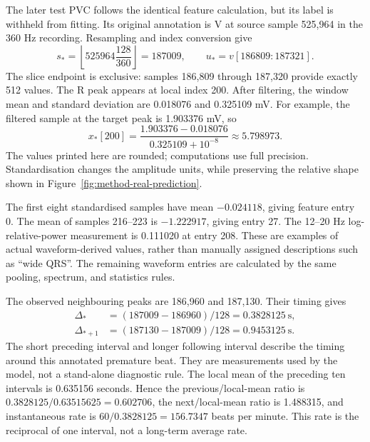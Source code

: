 The later test PVC follows the identical feature calculation, but its label
is withheld from fitting. Its original annotation is V at source sample
525,964 in the 360 Hz recording. Resampling and index conversion give
\begin{equation}
 s_* = \left\lfloor525964\frac{128}{360}\right\rfloor=187009,
 \qquad u_*=v[186809:187321].
 \label{eq:real-window-extraction}
\end{equation}
The slice endpoint is exclusive: samples 186,809 through 187,320 provide
exactly 512 values. The R peak appears at local index 200. After filtering,
the window mean and standard deviation are 0.018076 and 0.325109 mV.
For example, the filtered sample at the target peak is 1.903376 mV, so
\begin{equation}
 x_*[200]=\frac{1.903376-0.018076}{0.325109+10^{-8}}
 \approx5.798973.
 \label{eq:real-peak-scaling}
\end{equation}
The values printed here are rounded; computations use full precision.
Standardisation changes the amplitude units, while preserving the relative
shape shown in Figure~\ref{fig:method-real-prediction}.

The first eight standardised samples have mean $-0.024118$, giving feature
entry 0. The mean of samples 216--223 is $-1.222917$, giving entry 27.
The 12--20 Hz log-relative-power measurement is 0.111020 at entry 208.
These are examples of actual waveform-derived values, rather than manually
assigned descriptions such as ``wide QRS''. The remaining waveform entries
are calculated by the same pooling, spectrum, and statistics rules.

The observed neighbouring peaks are 186,960 and 187,130. Their timing gives
\begin{align}
 \Delta_*&=(187009-186960)/128=0.3828125\ \mathrm{s},\\
 \Delta_{*+1}&=(187130-187009)/128=0.9453125\ \mathrm{s}.
 \label{eq:real-rr-intervals}
\end{align}
The short preceding interval and longer following interval describe the
timing around this annotated premature beat. They are measurements used by
the model, not a stand-alone diagnostic rule. The local mean of the preceding
ten intervals is 0.635156 seconds. Hence the previous/local-mean ratio is
$0.3828125/0.63515625=0.602706$, the next/local-mean ratio is 1.488315,
and instantaneous rate is $60/0.3828125=156.7347$ beats per minute.
This rate is the reciprocal of one interval, not a long-term average rate.

